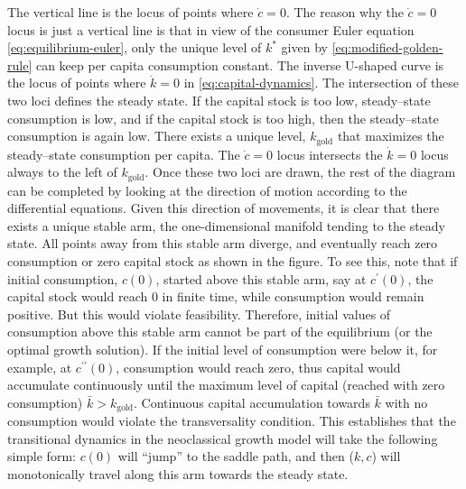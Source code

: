\documentclass[\topdir/lecture\_notes.tex]{subfiles}
\begin{document}
The vertical line is the locus of points where $\dot{c}=0$. The reason why the $\dot{c}=0$ locus is just a vertical line is that in view of the consumer Euler equation \eqref{eq:equilibrium-euler}, only the unique level of $k^{*}$ given by \eqref{eq:modified-golden-rule} can keep per capita consumption constant. The inverse U-shaped curve is the locus of points where $\dot{k}=0$ in \eqref{eq:capital-dynamics}. The intersection of these two loci defines the steady state. If the capital stock is too low, steady--state consumption is low, and if the capital stock is too high, then the steady--state consumption is again low. There exists a unique level, $k_{\text{gold}}$ that maximizes the steady--state consumption per capita. The $\dot{c}=0$ locus intersects the $\dot{k}=0$ locus always to the left of $k_{\text{gold}}$. Once these two loci are drawn, the rest of the diagram can be completed by looking at the direction of motion according to the differential equations. Given this direction of movements, it is clear that there exists a unique stable arm, the one-dimensional manifold tending to the steady state. All points away from this stable arm diverge, and eventually reach zero consumption or zero capital stock as shown in the figure. To see this, note that if initial consumption, $c(0)$, started above this stable arm, say at $c^{\prime}(0)$, the capital stock would reach 0 in finite time, while consumption would remain positive. But this would violate feasibility. Therefore, initial values of consumption above this stable arm cannot be part of the equilibrium (or the optimal growth solution). If the initial level of consumption were below it, for example, at $c^{\prime \prime}(0)$, consumption would reach zero, thus capital would accumulate continuously until the maximum level of capital (reached with zero consumption) $\bar{k}>k_{\text{gold}}$. Continuous capital accumulation towards $\bar{k}$ with no consumption would violate the transversality condition. This establishes that the transitional dynamics in the neoclassical growth model will take the following simple form: $c(0)$ will ``jump'' to the saddle path, and then ($k, c$) will monotonically travel along this arm towards the steady state.
\end{document}
